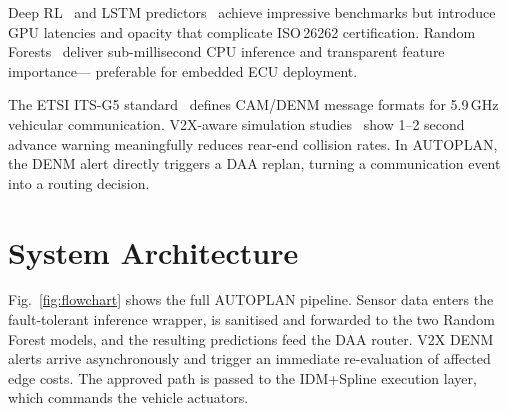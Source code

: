 \documentclass[conference]{IEEEtran}
\begin{document}
Deep RL~\cite{shalev2016safe} and LSTM predictors~\cite{altche2017lstm}
achieve impressive benchmarks but introduce GPU latencies and opacity that
complicate ISO\,26262 certification. Random Forests~\cite{breiman2001random}
deliver sub-millisecond CPU inference and transparent feature importance---
preferable for embedded ECU deployment.

The ETSI ITS-G5 standard~\cite{etsiITS} defines CAM/DENM message formats for
5.9\,GHz vehicular communication. V2X-aware simulation
studies~\cite{schunemann2011v2x} show 1--2 second advance warning
meaningfully reduces rear-end collision rates. In AUTOPLAN, the DENM alert
directly triggers a DAA replan, turning a communication event into a routing
decision.

\section{System Architecture}
\label{sec:arch}

Fig.~\ref{fig:flowchart} shows the full AUTOPLAN pipeline. Sensor data
enters the fault-tolerant inference wrapper, is sanitised and forwarded to
the two Random Forest models, and the resulting predictions feed the DAA
router. V2X DENM alerts arrive asynchronously and trigger an immediate
re-evaluation of affected edge costs. The approved path is passed to the
IDM+Spline execution layer, which commands the vehicle actuators.
\end{document}
